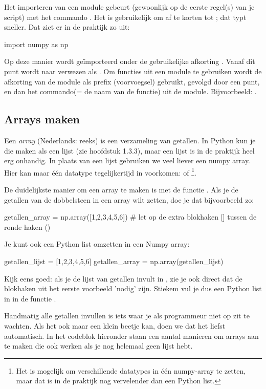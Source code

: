 \documentclass[a4paper,11pt, fleqn]{article}
\begin{document}
Het importeren van een module gebeurt (gewoonlijk op de eerste regel(s) van je script) met het commando . Het is gebruikelijk om  af te korten tot ; dat typt sneller. Dat ziet er in de praktijk zo uit: 
\begin{python}
import numpy as np
\end{python}
Op deze manier wordt  ge\"importeerd onder de gebruikelijke afkorting . Vanaf dit punt wordt naar  verwezen als . Om functies uit een module te gebruiken wordt de afkorting van de module als prefix (voorvoegsel) gebruikt, gevolgd door een punt, en dan het commando(= de naam van de functie) uit de module. Bijvoorbeeld: .%

\subsection{Arrays maken}
Een {\it array} (Nederlands: reeks) is een verzameling van getallen. In Python kun je die maken als een lijst (zie hoofdstuk 1.3.3), maar een lijst is in de praktijk heel erg onhandig. In plaats van een lijst gebruiken we veel liever een numpy array. Hier kan maar \'e\'en datatype tegelijkertijd in voorkomen:  of \footnote{Het is mogelijk om verschillende datatypes in \'e\'en numpy-array te zetten, maar dat is in de praktijk nog vervelender dan een Python list.}.

De duidelijkste manier om een array te maken is met de functie . Als je de getallen van de dobbelsteen in een array wilt zetten, doe je dat bijvoorbeeld zo:
\begin{python}
getallen_array = np.array([1,2,3,4,5,6]) 
# let op de extra blokhaken [] tussen de ronde haken ()
\end{python}

Je kunt ook een Python list omzetten in een Numpy array:
\begin{python}
getallen_lijst = [1,2,3,4,5,6]
getallen_array = np.array(getallen_lijst) 
\end{python}
Kijk eens goed: als je de lijst van getallen invult in , zie je ook direct dat de blokhaken uit het eerste voorbeeld 'nodig' zijn. Stiekem vul je dus een Python list in in de functie .

Handmatig alle getallen invullen is iets waar je als programmeur niet op zit te wachten. Als het ook maar een klein beetje kan, doen we dat het liefst automatisch. In het codeblok hieronder staan een aantal manieren om arrays aan te maken die ook werken als je nog helemaal geen lijst hebt.
\end{document}
